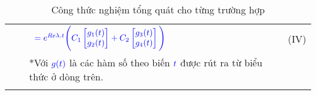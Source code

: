 \documentclass[a4paper]{article}
\begin{document}
\begin{table}[!htp]
\begin{tabular}{llll}
    & & \enskip \ $\textcolor{blue}{= e\sp{Re\lambda .t}\Bigg(C\sb{1} \begin{bmatrix} g\sb{1}(t) \\ g\sb{2}(t) \end{bmatrix}  + C\sb{2}\begin{bmatrix} g\sb{3}(t) \\ g\sb{4}(t) \end{bmatrix}\Bigg)}$ & (IV)\\
    & & \tiny{*Với $\textcolor{blue}{g(t)}$ là các hàm số theo biến $\textcolor{blue}{t}$ được rút ra từ biểu thức ở dòng trên.}\\
    \addlinespace
    \bottomrule
    \addlinespace
    \end{tabular}
    \caption{Công thức nghiệm tổng quát cho từng trường hợp} \label{tab2}
\end{table}
\newpage
\end{document}
